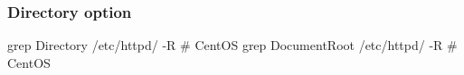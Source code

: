 \begin{frame}[fragile]
        \frametitle{Directory option}

 

grep Directory /etc/httpd/ -R  \# CentOS
grep DocumentRoot /etc/httpd/ -R  \# CentOS
\end{frame}

